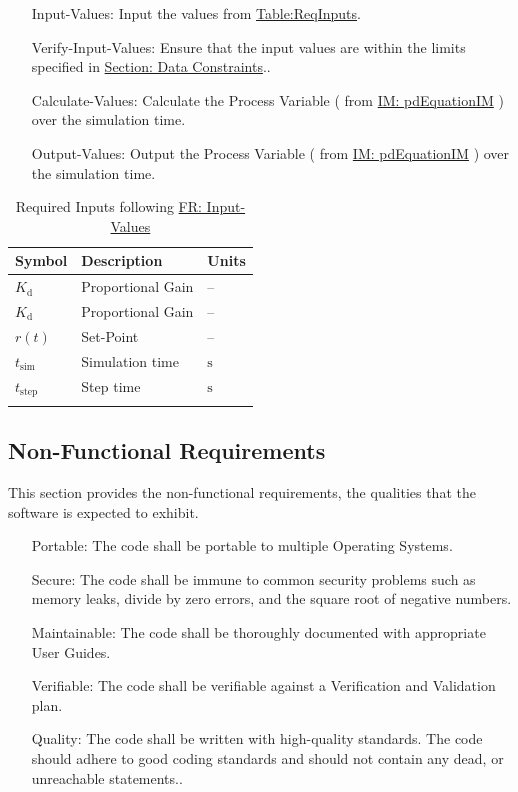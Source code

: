 \documentclass[12pt]{article}
\begin{document}
\begin{itemize}
\item[Input-Values:\phantomsection\label{inputValues}]{Input the values from \hyperref[Table:ReqInputs]{Table:ReqInputs}.}
\item[Verify-Input-Values:\phantomsection\label{verifyInputs}]{Ensure that the input values are within the limits specified in \hyperref[Sec:DataConstraints]{Section: Data Constraints}..}
\item[Calculate-Values:\phantomsection\label{calculateValues}]{Calculate the Process Variable ( from \hyperref[IM:pdEquationIM]{IM: pdEquationIM}  ) over  the simulation time.}
\item[Output-Values:\phantomsection\label{outputValues}]{Output the Process Variable ( from \hyperref[IM:pdEquationIM]{IM: pdEquationIM}  ) over  the simulation time.}
\end{itemize}
\begin{longtable}{l l l}
\toprule
\textbf{Symbol} & \textbf{Description} & \textbf{Units}
\\
\midrule
\endhead
${K_{\text{d}}}$ & Proportional Gain & --
\\
${K_{\text{d}}}$ & Proportional Gain & --
\\
$r(t)$ & Set-Point & --
\\
${t_{\text{sim}}}$ & Simulation time & ${\text{s}}$
\\
${t_{\text{step}}}$ & Step time & ${\text{s}}$
\\
\bottomrule
\caption{Required Inputs following \hyperref[inputValues]{FR: Input-Values}}
\label{Table:ReqInputs}
\end{longtable}
\subsection{Non-Functional Requirements}
\label{Sec:NFRs}
This section provides the non-functional requirements, the qualities that the software is expected to exhibit.

\begin{itemize}
\item[Portable:\phantomsection\label{portability}]{The code shall be portable to multiple Operating Systems.}
\item[Secure:\phantomsection\label{security}]{The code shall be immune to common security problems such as memory leaks, divide by zero errors, and the square root of negative numbers.}
\item[Maintainable:\phantomsection\label{maintainability}]{The code shall be thoroughly documented with appropriate User Guides.}
\item[Verifiable:\phantomsection\label{verifiability}]{The code shall be verifiable against a Verification and Validation plan.}
\item[Quality:\phantomsection\label{quality}]{The code shall be written with high-quality standards. The code should adhere to good coding standards and should not contain any dead, or unreachable statements..}
\end{itemize}
\end{document}
